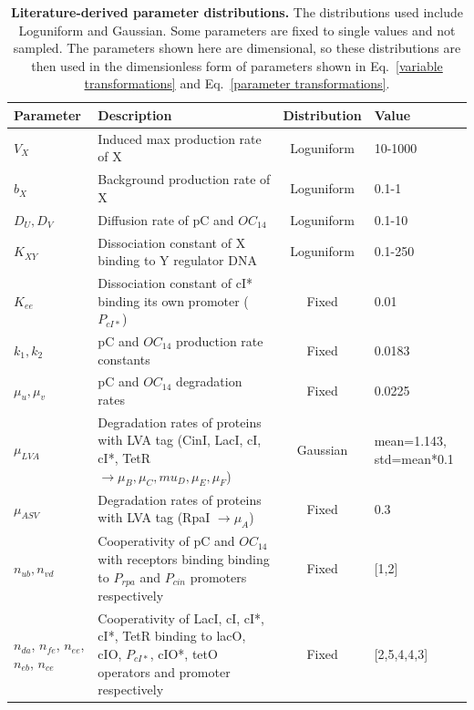 \begin{table}[H]
    \caption{\textbf{Literature-derived parameter distributions.} The distributions used include Loguniform and Gaussian.
    Some parameters are fixed to single values and not sampled.
    The parameters shown here are dimensional, so these distributions are then used in the dimensionless form of parameters shown in Eq.~\ref{variable transformations} and Eq.~\ref{parameter transformations}.}
\label{tab:literature param distributions}
\renewcommand{\arraystretch}{1.3} %
\begin{tabular}{|p{20mm}|p{57mm}|c|p{25mm}|}
\hline
\textbf{Parameter} & \textbf{Description} & \textbf{Distribution} & \textbf{Value}\\
\hline

$V_{X}$ & Induced max production rate of X & Loguniform &  10-1000 \\
\hline
$b_{X}$ & Background production rate of X & Loguniform & 0.1-1\\
\hline
$D_{U}, D_{V}$ & Diffusion rate of pC and $OC_{14}$ & Loguniform & 0.1-10\\
\hline
$K_{XY}$ & Dissociation constant of X binding to Y regulator DNA & Loguniform & 0.1-250\\
\hline
$K_{ee}$ & Dissociation constant of cI* binding its own promoter ($P_{cI*}$) & Fixed & 0.01\\
\hline
$k_{1},k_{2}$ & pC and $OC_{14}$ production rate constants  & Fixed & 0.0183\\
\hline
$\mu_{u},\mu_{v}$ & pC and $OC_{14}$ degradation rates & Fixed & 0.0225\\
\hline
$\mu_{LVA}$ & Degradation rates of proteins with LVA tag (CinI, LacI, cI, cI*, TetR $\rightarrow \mu_{B}, \mu_{C}, mu_{D}, \mu_{E}, \mu_{F}$) & Gaussian & mean=1.143, std=mean*0.1\\
\hline
$\mu_{ASV}$ & Degradation rates of proteins with LVA tag (RpaI $\rightarrow \mu_{A}$) & Fixed & 0.3\\
\hline
$n_{ub}, n_{vd}$ & Cooperativity of pC and $OC_{14}$ with receptors binding binding to $P_{rpa}$ and $P_{cin}$ promoters respectively & Fixed & [1,2]\\
\hline
$n_{da}$, $n_{fe}$, $n_{ee}$, $n_{eb}$, $n_{ce}$ & Cooperativity of LacI, cI, cI*, cI*, TetR binding to lacO, cIO, $P_{cI*}$, cIO*, tetO operators and promoter respectively & Fixed & [2,5,4,4,3]\\
\hline
\end{tabular}
\end{table}

